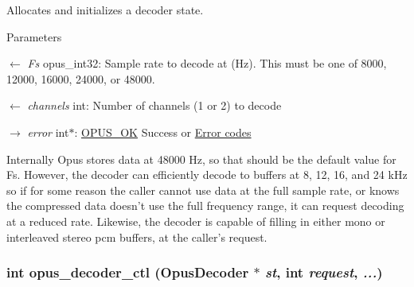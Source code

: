 Allocates and initializes a decoder state. 
\begin{DoxyParams}{Parameters}
\item[\mbox{$\leftarrow$} {\em Fs}]{\ttfamily opus\_\-int32}: Sample rate to decode at (Hz). This must be one of 8000, 12000, 16000, 24000, or 48000. \item[\mbox{$\leftarrow$} {\em channels}]{\ttfamily int}: Number of channels (1 or 2) to decode \item[\mbox{$\rightarrow$} {\em error}]{\ttfamily int$\ast$}: \hyperlink{group__opus__errorcodes_gaa44cf8a185e1b5cb940ef63eb4f02d21}{OPUS\_\-OK} Success or \hyperlink{group__opus__errorcodes}{Error codes}\end{DoxyParams}
Internally Opus stores data at 48000 Hz, so that should be the default value for Fs. However, the decoder can efficiently decode to buffers at 8, 12, 16, and 24 kHz so if for some reason the caller cannot use data at the full sample rate, or knows the compressed data doesn't use the full frequency range, it can request decoding at a reduced rate. Likewise, the decoder is capable of filling in either mono or interleaved stereo pcm buffers, at the caller's request. \hypertarget{group__opus__decoder_ga2d492844b4f66e7f34d85870f13d4846}{
\subsubsection[{opus\_\-decoder\_\-ctl}]{\setlength{\rightskip}{0pt plus 5cm}int opus\_\-decoder\_\-ctl ({\bf OpusDecoder} $\ast$ {\em st}, \/  int {\em request}, \/   {\em ...})}}
\label{group__opus__decoder_ga2d492844b4f66e7f34d85870f13d4846}


